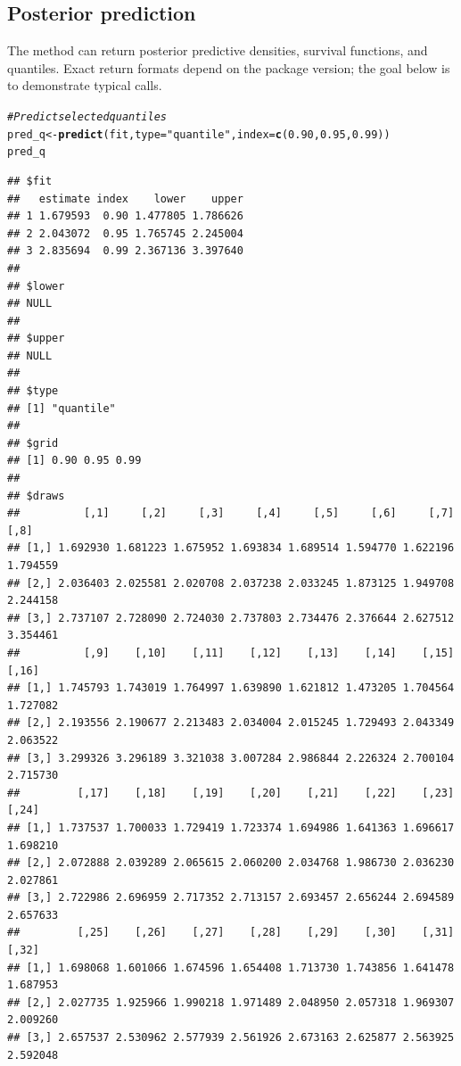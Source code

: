 \documentclass[article]{jss}\usepackage[]{graphicx}\usepackage[]{xcolor}
\makeatletter
\newcommand{\hlnum}[1]{\textcolor[rgb]{0.686,0.059,0.569}{#1}}%
\newcommand{\hlsng}[1]{\textcolor[rgb]{0.192,0.494,0.8}{#1}}%
\newcommand{\hlcom}[1]{\textcolor[rgb]{0.678,0.584,0.686}{\textit{#1}}}%
\newcommand{\hldef}[1]{\textcolor[rgb]{0.345,0.345,0.345}{#1}}%
\newcommand{\hlkwb}[1]{\textcolor[rgb]{0.69,0.353,0.396}{#1}}%
\newcommand{\hlkwc}[1]{\textcolor[rgb]{0.333,0.667,0.333}{#1}}%
\newcommand{\hlkwd}[1]{\textcolor[rgb]{0.737,0.353,0.396}{\textbf{#1}}}%
\newenvironment{kframe}{%
 \def\at@end@of@kframe{}%
 \ifinner\ifhmode%
  \def\at@end@of@kframe{\end{minipage}}%
  \begin{minipage}{\columnwidth}%
 \fi\fi%
 \def\FrameCommand##1{\hskip\@totalleftmargin \hskip-\fboxsep
 \colorbox{shadecolor}{##1}\hskip-\fboxsep
     \hskip-\linewidth \hskip-\@totalleftmargin \hskip\columnwidth}%
 \MakeFramed {\advance\hsize-\width
   \@totalleftmargin\z@ \linewidth\hsize
   \@setminipage}}%
 {\par\unskip\endMakeFramed%
 \at@end@of@kframe}
\newenvironment{knitrout}{}{} %
\makeatother
\begin{document}
\subsection{Posterior prediction}

The  method can return posterior predictive densities, survival functions, and quantiles.
Exact return formats depend on the package version; the goal below is to demonstrate typical calls.

\begin{knitrout}
\color{fgcolor}\begin{kframe}
\begin{alltt}
\hlcom{# Predict selected quantiles}
\hldef{pred_q} \hlkwb{<-} \hlkwd{predict}\hldef{(fit,} \hlkwc{type} \hldef{=} \hlsng{"quantile"}\hldef{,} \hlkwc{index} \hldef{=} \hlkwd{c}\hldef{(}\hlnum{0.90}\hldef{,} \hlnum{0.95}\hldef{,} \hlnum{0.99}\hldef{))}
\hldef{pred_q}
\end{alltt}
\begin{verbatim}
## $fit
##   estimate index    lower    upper
## 1 1.679593  0.90 1.477805 1.786626
## 2 2.043072  0.95 1.765745 2.245004
## 3 2.835694  0.99 2.367136 3.397640
## 
## $lower
## NULL
## 
## $upper
## NULL
## 
## $type
## [1] "quantile"
## 
## $grid
## [1] 0.90 0.95 0.99
## 
## $draws
##          [,1]     [,2]     [,3]     [,4]     [,5]     [,6]     [,7]     [,8]
## [1,] 1.692930 1.681223 1.675952 1.693834 1.689514 1.594770 1.622196 1.794559
## [2,] 2.036403 2.025581 2.020708 2.037238 2.033245 1.873125 1.949708 2.244158
## [3,] 2.737107 2.728090 2.724030 2.737803 2.734476 2.376644 2.627512 3.354461
##          [,9]    [,10]    [,11]    [,12]    [,13]    [,14]    [,15]    [,16]
## [1,] 1.745793 1.743019 1.764997 1.639890 1.621812 1.473205 1.704564 1.727082
## [2,] 2.193556 2.190677 2.213483 2.034004 2.015245 1.729493 2.043349 2.063522
## [3,] 3.299326 3.296189 3.321038 3.007284 2.986844 2.226324 2.700104 2.715730
##         [,17]    [,18]    [,19]    [,20]    [,21]    [,22]    [,23]    [,24]
## [1,] 1.737537 1.700033 1.729419 1.723374 1.694986 1.641363 1.696617 1.698210
## [2,] 2.072888 2.039289 2.065615 2.060200 2.034768 1.986730 2.036230 2.027861
## [3,] 2.722986 2.696959 2.717352 2.713157 2.693457 2.656244 2.694589 2.657633
##         [,25]    [,26]    [,27]    [,28]    [,29]    [,30]    [,31]    [,32]
## [1,] 1.698068 1.601066 1.674596 1.654408 1.713730 1.743856 1.641478 1.687953
## [2,] 2.027735 1.925966 1.990218 1.971489 2.048950 2.057318 1.969307 2.009260
## [3,] 2.657537 2.530962 2.577939 2.561926 2.673163 2.625877 2.563925 2.592048

\end{verbatim}
\end{kframe}
\end{knitrout}
\end{document}
